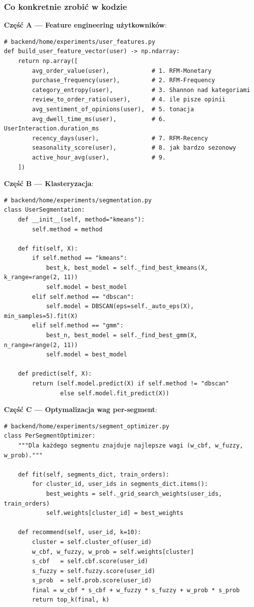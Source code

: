 \documentclass[a4paper,11pt]{article}
\begin{document}
\subsubsection*{Co konkretnie zrobić w kodzie}

\textbf{Część A --- Feature engineering użytkowników}:

\begin{lstlisting}
# backend/home/experiments/user_features.py
def build_user_feature_vector(user) -> np.ndarray:
    return np.array([
        avg_order_value(user),            # 1. RFM-Monetary
        purchase_frequency(user),         # 2. RFM-Frequency
        category_entropy(user),           # 3. Shannon nad kategoriami
        review_to_order_ratio(user),      # 4. ile pisze opinii
        avg_sentiment_of_opinions(user),  # 5. tonacja
        avg_dwell_time_ms(user),          # 6. UserInteraction.duration_ms
        recency_days(user),               # 7. RFM-Recency
        seasonality_score(user),          # 8. jak bardzo sezonowy
        active_hour_avg(user),            # 9.
    ])
\end{lstlisting}

\textbf{Część B --- Klasteryzacja}:

\begin{lstlisting}
# backend/home/experiments/segmentation.py
class UserSegmentation:
    def __init__(self, method="kmeans"):
        self.method = method

    def fit(self, X):
        if self.method == "kmeans":
            best_k, best_model = self._find_best_kmeans(X, k_range=range(2, 11))
            self.model = best_model
        elif self.method == "dbscan":
            self.model = DBSCAN(eps=self._auto_eps(X), min_samples=5).fit(X)
        elif self.method == "gmm":
            best_n, best_model = self._find_best_gmm(X, n_range=range(2, 11))
            self.model = best_model

    def predict(self, X):
        return (self.model.predict(X) if self.method != "dbscan"
                else self.model.fit_predict(X))
\end{lstlisting}

\textbf{Część C --- Optymalizacja wag per-segment}:

\begin{lstlisting}
# backend/home/experiments/segment_optimizer.py
class PerSegmentOptimizer:
    """Dla każdego segmentu znajduje najlepsze wagi (w_cbf, w_fuzzy, w_prob)."""

    def fit(self, segments_dict, train_orders):
        for cluster_id, user_ids in segments_dict.items():
            best_weights = self._grid_search_weights(user_ids, train_orders)
            self.weights[cluster_id] = best_weights

    def recommend(self, user_id, k=10):
        cluster = self.cluster_of(user_id)
        w_cbf, w_fuzzy, w_prob = self.weights[cluster]
        s_cbf   = self.cbf.score(user_id)
        s_fuzzy = self.fuzzy.score(user_id)
        s_prob  = self.prob.score(user_id)
        final = w_cbf * s_cbf + w_fuzzy * s_fuzzy + w_prob * s_prob
        return top_k(final, k)
\end{lstlisting}
\end{document}
